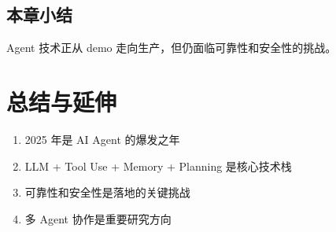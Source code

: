 \documentclass[a4paper]{article}
\begin{document}
\subsection{本章小结}
Agent 技术正从 demo 走向生产，但仍面临可靠性和安全性的挑战。

\section{总结与延伸}
\begin{enumerate}
  \item 2025 年是 AI Agent 的爆发之年
  \item LLM + Tool Use + Memory + Planning 是核心技术栈
  \item 可靠性和安全性是落地的关键挑战
  \item 多 Agent 协作是重要研究方向
\end{enumerate}
\end{document}
